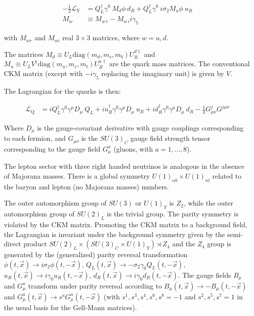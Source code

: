 \documentclass[11pt]{book}
\begin{document}
\begin{equation}\begin{aligned}
    -\frac{1}{2}{\mathcal{L}}_{\mathrm Y} &=Q_{L}^\dagger\gamma^0\ M_d \phi\ d_{R}+
    Q_{L}^\dagger \gamma^0\ i\sigma_2 M_u \phi\ u_{R} \\
    M_{w}&\equiv M_{w\,r}-M_{w\,i}i\gamma_5\end{aligned}\end{equation}

with \(M_{w r}\) and \(M_{w i}\) real \(3\times 3\) matrices, where
\(w=u,d\).

The matrices \(M_d\equiv U_L \mathrm{diag}(m_d,m_s,m_b)U_R^{d\dagger}\)
and \(M_u\equiv U_LV^\dagger \mathrm{diag}(m_u,m_c,m_t)U_R^{u\dagger}\)
are the quark mass matrices. The conventional CKM matrix (except with
\(-i\gamma_5\) replacing the imaginary unit) is given by \(V\).

The Lagrangian for the quarks is then:

\begin{equation}\begin{aligned}
    {\mathcal{L}}_{\mathrm Q} &=iQ_{L}^\dagger\gamma^0\gamma^\mu D_\mu\ Q_{L}+iu_{R}^\dagger\gamma^0\gamma^\mu D_\mu\ u_{R}+id_{R}^\dagger\gamma^0\gamma^\mu D_\mu\ d_{R}-\frac{1}{4}G_{\mu\nu}^j G^{j\mu\nu} \end{aligned}\end{equation}

Where \(D_\mu\) is the gauge-covariant derivative with gauge couplings
corresponding to each fermion, and \(G_{\mu\nu}\) is the \(SU(3)_C\)
gauge field strength tensor corresponding to the gauge field \(G_\mu^a\)
(gluons, with \(a=1,...,8\)).

The lepton sector with three right handed neutrinos is analogous in the
absence of Majorana masses. There is a global symmetry
\(U(1)_{nb}\times U(1)_{nl}\) related to the baryon and lepton (no
Majorana masses) numbers.

The outer automorphism group of \(SU(3)\) or \(U(1)_Y\) is \(Z_2\),
while the outer automorphism group of \(SU(2)_L\) is the trivial group.
The parity symmetry is violated by the CKM matrix. Promoting the CKM
matrix to a background field, the Lagrangian is invariant under the
background symmetry given by the semi-direct product
\(SU(2)_L\times (SU(3)_C\times U(1)_Y)\rtimes Z_4\) and the \(Z_4\)
group is generated by the (generalized) parity reversal transformation
\(\phi(t,\vec{x})\to i\sigma_2\phi(t,-\vec{x})\),
\(Q_L(t,\vec{x})\to -\sigma_2\gamma_0Q_L(t,-\vec{x})\),
\(u_R(t,\vec{x})\to i\gamma_0 u_R(t,-\vec{x})\),
\(d_R(t,\vec{x})\to i\gamma_0 d_R(t,-\vec{x})\). The gauge fields
\(B_\mu\) and \(G_{\mu}^a\) transform under parity reversal according to
\(B_\mu(t,\vec{x})\to -B_\mu(t,-\vec{x})\) and
\(G_\mu^a(t,\vec{x})\to s^a G_\mu^a(t,-\vec{x})\) (with
\(s^1,s^3,s^4,s^6,s^8=-1\) and \(s^2,s^5,s^7=1\) in the usual basis for
the Gell-Mann matrices).
\end{document}
